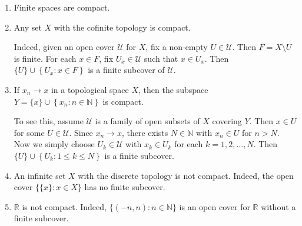 \documentclass[a4paper]{article}
\begin{document}
\begin{example}
    \begin{enumerate}
        \item Finite spaces are compact.
      
        \item Any set $X$ with the cofinite topology is compact. 
        
        Indeed, given an open cover $\mathcal{U}$ for $X$, fix a non-empty $U \in \mathcal{U}$. Then $F=X \setminus U$ is finite. For each $x \in F$, fix $U_{x} \in \mathcal{U}$ such that $x \in U_{x}$. Then $\{U\} \cup\left\{U_{x}: x \in F\right\}$ is a finite subcover of $\mathcal{U}$.
        \item If $x_{n} \rightarrow x$ in a topological space $X$, then the subspace $Y=\{x\} \cup\left\{x_{n}: n \in \mathbb{N}\right\}$ is compact. 
        
        To see this, assume $\mathcal{U}$ is a family of open subsets of $X$ covering $Y$. Then $x \in U$ for some $U \in \mathcal{U}$. Since $x_{n} \rightarrow x$, there exists $N \in \mathbb{N}$ with $x_{n} \in U$ for $n>N$. Now we simply choose $U_{k} \in \mathcal{U}$ with $x_{k} \in U_{k}$ for each $k=1,2, \ldots, N$. Then $\{U\} \cup\left\{U_{k}: 1 \leqslant k \leqslant N\right\}$ is a finite subcover.

        \item An infinite set $X$ with the discrete topology is not compact. Indeed, the open cover $\{\{x\}: x \in X\}$ has no finite subcover.

  \item $\mathbb{R}$ is not compact. Indeed, $\{(-n, n): n \in \mathbb{N}\}$ is an open cover for $\mathbb{R}$ without a finite subcover.
      \end{enumerate}
\end{example}
\end{document}
